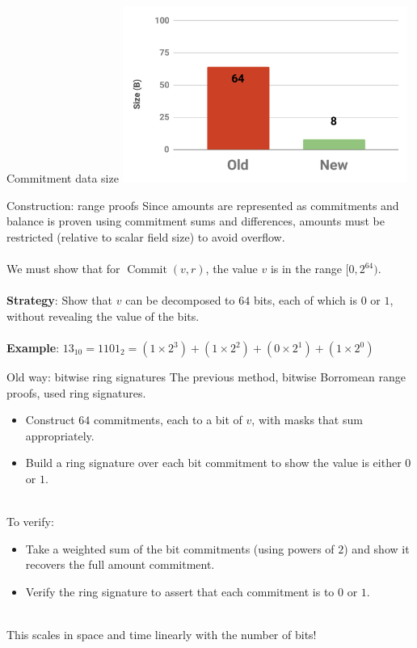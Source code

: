 \documentclass[aspectratio=169]{beamer}
\begin{document}
\begin{frame}{Commitment data size}
\centering
\includegraphics[width=0.7\textwidth]{commit.pdf}
\end{frame}


\begin{frame}{Construction: range proofs}
Since amounts are represented as commitments and balance is proven using commitment sums and differences, amounts must be restricted (relative to scalar field size) to avoid overflow. \\~\\

We must show that for $\operatorname{Commit}(v,r)$, the value $v$ is in the range $[0,2^{64})$. \\~\\

\textbf{Strategy}: Show that $v$ can be decomposed to $64$ bits, each of which is $0$ or $1$, without revealing the value of the bits. \\~\\

\textbf{Example}: $13_{10} = 1101_2 = (1 \times 2^3) + (1 \times 2^2) + (0 \times 2^1) + (1 \times 2^0)$
\end{frame}


\begin{frame}{Old way: bitwise ring signatures}
The previous method, bitwise Borromean range proofs, used ring signatures.
\begin{itemize}
\item Construct $64$ commitments, each to a bit of $v$, with masks that sum appropriately.
\item Build a ring signature over each bit commitment to show the value is either $0$ or $1$. \\~\\
\end{itemize}

To verify:
\begin{itemize}
\item Take a weighted sum of the bit commitments (using powers of $2$) and show it recovers the full amount commitment.
\item Verify the ring signature to assert that each commitment is to $0$ or $1$. \\~\\
\end{itemize}

This scales in space and time linearly with the number of bits!
\end{frame}
\end{document}
